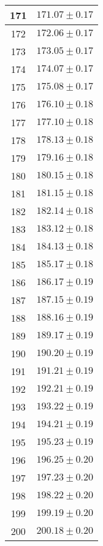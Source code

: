 \documentclass[prb,12pt]{revtex4-2}
\theoremstyle{definition}
\theoremstyle{definition}
\begin{document}
\begin{longtable}{cc}
	171 & $171.07\pm 0.17$ \\\midrule
	172 & $172.06\pm 0.17$ \\\midrule
	173 & $173.05\pm 0.17$ \\\midrule
	174 & $174.07\pm 0.17$ \\\midrule
	175 & $175.08\pm 0.17$ \\\midrule
	176 & $176.10\pm 0.18$ \\\midrule
	177 & $177.10\pm 0.18$ \\\midrule
	178 & $178.13\pm 0.18$ \\\midrule
	179 & $179.16\pm 0.18$ \\\midrule
	180 & $180.15\pm 0.18$ \\\midrule
	181 & $181.15\pm 0.18$ \\\midrule
	182 & $182.14\pm 0.18$ \\\midrule
	183 & $183.12\pm 0.18$ \\\midrule
	184 & $184.13\pm 0.18$ \\\midrule
	185 & $185.17\pm 0.18$ \\\midrule
	186 & $186.17\pm 0.19$ \\\midrule
	187 & $187.15\pm 0.19$ \\\midrule
	188 & $188.16\pm 0.19$ \\\midrule
	189 & $189.17\pm 0.19$ \\\midrule
	190 & $190.20\pm 0.19$ \\\midrule
	191 & $191.21\pm 0.19$ \\\midrule
	192 & $192.21\pm 0.19$ \\\midrule
	193 & $193.22\pm 0.19$ \\\midrule
	194 & $194.21\pm 0.19$ \\\midrule
	195 & $195.23\pm 0.19$ \\\midrule
	196 & $196.25\pm 0.20$ \\\midrule
	197 & $197.23\pm 0.20$ \\\midrule
	198 & $198.22\pm 0.20$ \\\midrule
	199 & $199.19\pm 0.20$ \\\midrule
	200 & $200.18\pm 0.20$ \\\midrule
\end{longtable}
\end{document}
